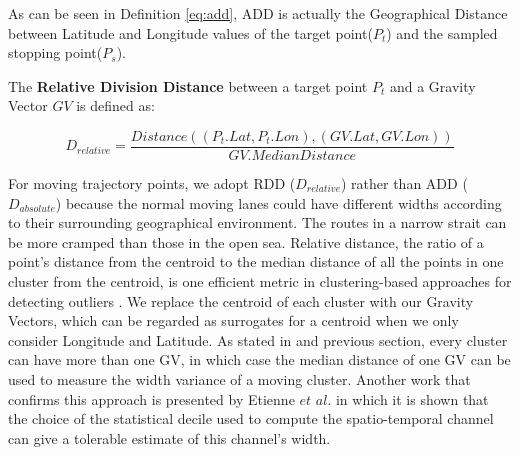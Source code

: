 \documentclass[12pt,glossary]{dalcsthesis}
\begin{document}
As can be seen in Definition \ref{eq:add}, ADD is actually the Geographical Distance \cite{gpsDistance} between %
Latitude and Longitude values of the target point($P_t$) and the sampled stopping point($P_s$). %

The \textbf{Relative Division Distance} between a target point $P_t$ and a Gravity Vector $GV$ is defined as:

\begin{equation}
\label{eq:rdd}
D_{relative} = \frac{Distance((P_t.Lat,P_t.Lon),(GV.Lat,GV.Lon))}{GV.MedianDistance}
\end{equation}



For moving trajectory points, we adopt RDD ($D_{relative}$) rather than ADD ($D_{absolute}$) because the normal moving lanes could have different widths according to their surrounding geographical environment. The routes in a narrow strait can be more cramped than those in the open sea. Relative distance, the ratio of a point's distance from the centroid to the median distance of all the points in one cluster from the centroid, is one efficient metric in clustering-based approaches for detecting outliers \cite{PangNing05}. We replace the centroid of each cluster with our Gravity Vectors, which can be regarded as surrogates for a centroid when we only consider Longitude and Latitude.
As stated in \cite{bigdata2014} and previous section, every cluster can have more than one GV, in which case the median distance %
of one GV
can be used to measure the width variance of a moving cluster. Another work that confirms this approach is presented by Etienne $et$ $al.$ \cite{Etienne12} in which it is shown that
the choice of the statistical decile used to compute the spatio-temporal channel can give a tolerable estimate of this channel's width.\\
\end{document}
